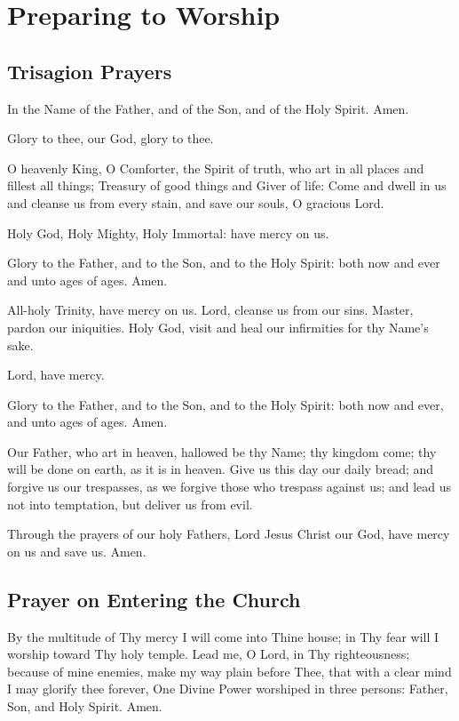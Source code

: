 \section{Preparing to Worship}

\subsection{Trisagion Prayers}

In the Name of the Father, and of the Son, and of the Holy Spirit. Amen.

Glory to thee, our God, glory to thee.

O heavenly King, O Comforter, the Spirit of truth, who art in all places and fillest all things; Treasury of good things and Giver of life: Come and dwell in us and cleanse us from every stain, and save our souls, O gracious Lord.

Holy God, Holy Mighty, Holy Immortal: have mercy on us. 

Glory to the Father, and to the Son, and to the Holy Spirit: both now and ever and unto ages of ages. Amen.

All-holy Trinity, have mercy on us. Lord, cleanse us from our sins. Master, pardon our iniquities. Holy God, visit and heal our infirmities for thy Name's sake.

Lord, have mercy. 

Glory to the Father, and to the Son, and to the Holy Spirit: both now and ever, and unto ages of ages. Amen.

Our Father, who art in heaven, hallowed be thy Name; thy kingdom come; thy will be done on earth, as it is in heaven. Give us this day our daily bread; and forgive us our trespasses, as we forgive those who trespass against us; and lead us not into temptation, but deliver us from evil.

Through the prayers of our holy Fathers, Lord Jesus Christ our God, have mercy on us and save us. Amen.

\subsection{Prayer on Entering the Church}

    By the multitude of Thy mercy I will come into Thine house; in Thy fear will I worship toward Thy holy temple. Lead me, O Lord, in Thy righteousness; because of mine enemies, make my way plain before Thee, that with a clear mind I may glorify thee forever, One Divine Power worshiped in three persons: Father, Son, and Holy Spirit. Amen. 

